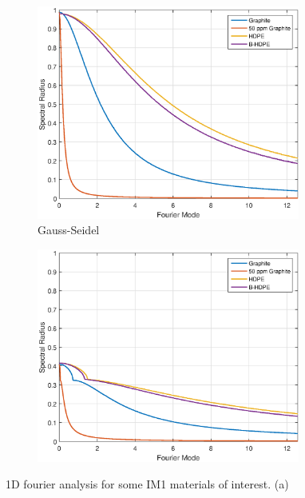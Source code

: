 \begin{figure}
\centering
{
	\begin{subfigure}[b]{0.7\textwidth}
		\centering
		\includegraphics[width=0.95\textwidth]{figures/sec_DSA/P0_Unaccelerated_IM1_Fourier_TG.eps}
		\caption{Gauss-Seidel}
	\end{subfigure}
}
	\vspace{1cm}
{
	\begin{subfigure}[b]{0.7\textwidth}
		\centering
		\includegraphics[width=0.95\textwidth]{figures/sec_DSA/P0_Accelerated_IM1_Fourier_TG.eps}
		\caption{}
	\end{subfigure}
}
\caption{1D fourier analysis for some IM1 materials of interest. (a) }
\label{fig::IM1_TG_fourier_somemates}
\end{figure}

